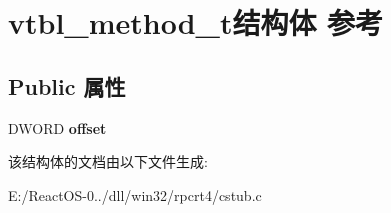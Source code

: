 \hypertarget{structvtbl__method__t}{}\section{vtbl\+\_\+method\+\_\+t结构体 参考}
\label{structvtbl__method__t}
\subsection*{Public 属性}
\begin{DoxyCompactItemize}
\item 
\mbox{\label{structvtbl__method__t_a26e0101995bfbde3fec70ae16c6eb7bf}} 
D\+W\+O\+RD {\bfseries offset}
\end{DoxyCompactItemize}


该结构体的文档由以下文件生成\+:\begin{DoxyCompactItemize}
\item 
E\+:/\+React\+O\+S-\/0../dll/win32/rpcrt4/cstub.\+c\end{DoxyCompactItemize}
